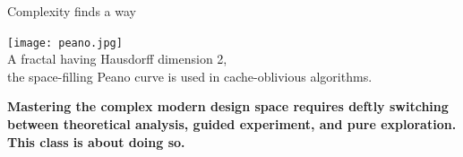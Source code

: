 \documentclass[mathserif,xcolor={dvipsnames,table}]{beamer}
\begin{document}
\begin{frame}{Complexity finds a way}
\begin{center}
\texttt{[image: peano.jpg]}\\
\tiny{A fractal having Hausdorff dimension 2,\\
the space-filling Peano curve is used in cache-oblivious algorithms.}
\end{center}
\vfill
\large{\textbf{Mastering the complex modern design space requires deftly
switching between theoretical analysis, guided experiment, and pure
exploration.\\
\vspace{.25in}
This class is about doing so.}}
\end{frame}

%
\end{document}
